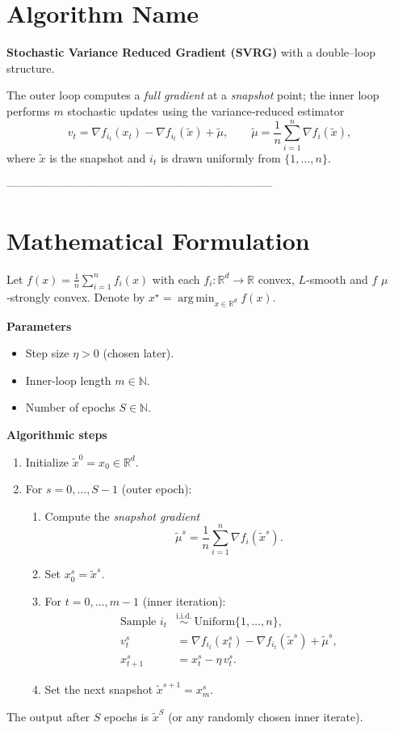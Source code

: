 \documentclass{article}
\newcommand{\grad}{\nabla}
\newcommand{\R}{\mathbb{R}}
\newcommand{\argmin}{\operatorname*{arg\,min}}
\begin{document}
\section*{Algorithm Name}
\textbf{Stochastic Variance Reduced Gradient (SVRG)} with a double–loop structure.  

The outer loop computes a \emph{full gradient} at a \emph{snapshot} point; the inner loop performs $m$ stochastic updates using the variance‑reduced estimator  
\[
v_{t}= \grad f_{i_t}(x_{t})-\grad f_{i_t}(\tilde{x})+\tilde{\mu},
\qquad 
\tilde{\mu}= \frac1n\sum_{i=1}^{n}\grad f_i(\tilde{x}),
\]
where $\tilde{x}$ is the snapshot and $i_t$ is drawn uniformly from $\{1,\dots,n\}$.

-----------------------------------------------------------------------

\section*{Mathematical Formulation}
Let $f(x)=\frac1n\sum_{i=1}^{n}f_i(x)$ with each $f_i:\R^d\!\to\!\R$ convex, $L$‑smooth and $f$ $\mu$‑strongly convex.  
Denote by $x^{\star}= \argmin_{x\in\R^d} f(x)$.  

\bigskip
\noindent\textbf{Parameters}
\begin{itemize}[noitemsep]
    \item Step size $\eta>0$ (chosen later).
    \item Inner‑loop length $m\in\mathbb{N}$.
    \item Number of epochs $S\in\mathbb{N}$.
\end{itemize}
\bigskip

\noindent\textbf{Algorithmic steps}
\begin{enumerate}
    \item Initialize $ \tilde{x}^{0}=x_{0}\in\R^{d}$.
    \item For $s=0,\dots,S-1$ (outer epoch):
    \begin{enumerate}
        \item Compute the \emph{snapshot gradient}
        \[
        \tilde{\mu}^{s}= \frac1n\sum_{i=1}^{n}\grad f_i(\tilde{x}^{s}).
        \]
        \item Set $x_{0}^{s}= \tilde{x}^{s}$.
        \item For $t=0,\dots,m-1$ (inner iteration):
        \[
        \begin{aligned}
            \text{Sample } i_t &\stackrel{\text{i.i.d.}}{\sim}\ \text{Uniform}\{1,\dots,n\},\\
            v_{t}^{s}&= \grad f_{i_t}(x_{t}^{s})-\grad f_{i_t}(\tilde{x}^{s})+\tilde{\mu}^{s},\\
            x_{t+1}^{s}&= x_{t}^{s}-\eta\, v_{t}^{s}.
        \end{aligned}
        \]
        \item Set the next snapshot $\tilde{x}^{s+1}=x_{m}^{s}$.
    \end{enumerate}
\end{enumerate}
The output after $S$ epochs is $\tilde{x}^{S}$ (or any randomly chosen inner iterate).
\end{document}
